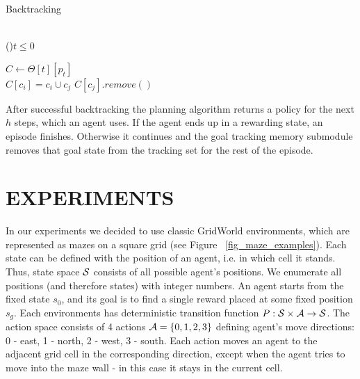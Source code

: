 \documentclass[a4paper,twoside]{article}
\begin{document}
\begin{algorithm}
  \caption{Backtracking} \label{alg_Backtracking}
  \quad \\
  
  \If(){$t \leq 0$} {
  }{}

  $C \gets \Theta[t][p_t]$ \;
  \quad \\

   {
    $C[c_i] = c_i \cup c_j$ \;
    $C[c_j].remove()$ \;
  }
  \quad \\


\end{algorithm}

After successful backtracking the planning algorithm returns a policy for the next $h$ steps, which an agent uses. If the agent ends up in a rewarding state, an episode finishes. Otherwise it continues and the goal tracking memory submodule removes that goal state from the tracking set for the rest of the episode.

\section{\uppercase{Experiments}}

In our experiments we decided to use classic GridWorld environments, which are represented as mazes on a square grid (see Figure ~\ref{fig_maze_examples}). Each state can be defined with the position of an agent, i.e. in which cell it stands. Thus, state space $\mathcal{S}$ consists of all possible agent's positions. We enumerate all positions (and therefore states) with integer numbers. An agent starts from the fixed state $s_0$, and its goal is to find a single reward placed at some fixed position $s_g$. Each environments has deterministic transition function $P: \mathcal{S} \times \mathcal{A} \rightarrow \mathcal{S}$. The action space consists of 4 actions $\mathcal{A} = \{ 0, 1, 2, 3 \}$ defining agent's move directions: 0 - east, 1 - north, 2 - west, 3 - south. Each action moves an agent to the adjacent grid cell in the corresponding direction, except when the agent tries to move into the maze wall - in this case it stays in the current cell.
\end{document}
